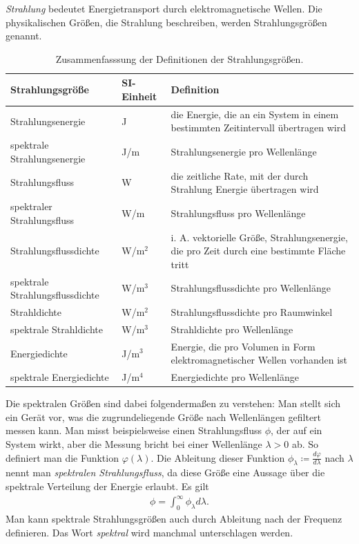 \documentclass{book}
\begin{document}
\textit{Strahlung} bedeutet Energietransport durch elektromagnetische Wellen. Die physikalischen Größen, die Strahlung beschreiben, werden Strahlungsgrößen genannt.
%
\renewcommand{\arraystretch}{1.2}
\begin{table}
\centering
\begin{tabular}{|>{\centering}p{4.0 cm}|>{\centering}p{3 cm}|>{\centering}p{7 cm}|}
\hline \textbf{Strahlungsgröße} & \textbf{SI-Einheit} & \textbf{Definition}\tabularnewline
\hline\hline Strahlungsenergie\index{Strahlungsenergie} & J & die Energie, die an ein System in einem bestimmten Zeitintervall übertragen wird\tabularnewline
\hline spektrale Strahlungsenergie & J/m & Strahlungsenergie pro Wellenlänge\tabularnewline 
\hline Strahlungsfluss\index{Strahlungsfluss} & W & die zeitliche Rate, mit der durch Strahlung Energie übertragen wird\tabularnewline
\hline spektraler Strahlungsfluss & W/m & Strahlungsfluss pro Wellenlänge\tabularnewline
\hline Strahlungsflussdichte\index{Strahlungsflussdichte} & W/m$^2$ & i. A. vektorielle Größe, Strahlungsenergie, die pro Zeit durch eine bestimmte Fläche tritt\tabularnewline
\hline spektrale Strahlungsflussdichte & W/m$^3$ & Strahlungsflussdichte pro Wellenlänge\tabularnewline 
\hline Strahldichte\index{Strahldichte} & W/m$^2$ & Strahlungsflussdichte pro Raumwinkel\tabularnewline
\hline spektrale Strahldichte & W/m$^3$ & Strahldichte pro Wellenlänge\tabularnewline
\hline Energiedichte\index{Energiedichte} & J/m$^3$ & Energie, die pro Volumen in Form elektromagnetischer Wellen vorhanden ist\tabularnewline 
\hline spektrale Energiedichte & J/m$^4$ & Energiedichte pro Wellenlänge\tabularnewline
\hline 
\end{tabular}
\caption{Zusammenfasssung der Definitionen der Strahlungsgrößen.}
\end{table}
\renewcommand{\arraystretch}{1.0}
%
Die spektralen Größen sind dabei folgendermaßen zu verstehen: Man stellt sich ein Gerät vor, was die zugrundeliegende Größe nach Wellenlängen gefiltert messen kann. Man misst beispielsweise einen Strahlungsfluss $\phi$, der auf ein System wirkt, aber die Messung bricht bei einer Wellenlänge $\lambda > 0$ ab. So definiert man die Funktion $\varphi\left(\lambda\right)$. Die Ableitung dieser Funktion $\phi
_\lambda \coloneqq \frac{d\varphi}{d\lambda}$ nach $\lambda$ nennt man \textit{spektralen Strahlungsfluss}, da diese Größe eine Aussage über die spektrale Verteilung der Energie erlaubt. Es gilt
%
\begin{eqnarray}
\phi = \int_{0}^{\infty}\phi_\lambda d\lambda.
\end{eqnarray}
%
Man kann spektrale Strahlungsgrößen auch durch Ableitung nach der Frequenz definieren. Das Wort \textit{spektral} wird manchmal unterschlagen werden.
\end{document}
